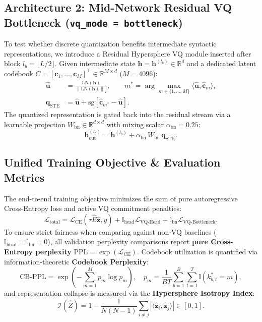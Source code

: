 \documentclass[11pt,a4paper]{article}
\newcommand{\norm}[1]{\left\lVert#1\right\rVert}
\newcommand{\R}{\mathbb{R}}
\begin{document}
\subsection{Architecture 2: Mid-Network Residual VQ Bottleneck (\texttt{vq\_mode = bottleneck})}
To test whether discrete quantization benefits intermediate syntactic representations, we introduce a Residual Hypersphere VQ module inserted after block $l_b = \lfloor L/2 \rfloor$. Given intermediate state $\bm{h} = \bm{h}^{(l_b)} \in \R^d$ and a dedicated latent codebook $C = [\bm{c}_1, \dots, \bm{c}_M]^\top \in \R^{M \times d}$ ($M = 4096$):
\begin{align}
    \hat{\bm{u}} &= \frac{\text{LN}(\bm{h})}{\norm{\text{LN}(\bm{h})}_2}, \qquad m^* = \arg\max_{m \in \{1,\dots,M\}} \langle \hat{\bm{u}}, \hat{\bm{c}}_m \rangle, \\
    \bm{q}_{\text{STE}} &= \hat{\bm{u}} + \text{sg}\!\left[\hat{\bm{c}}_{m^*} - \hat{\bm{u}}\right].
\end{align}
The quantized representation is gated back into the residual stream via a learnable projection $W_{\text{bn}} \in \R^{d \times d}$ with mixing scalar $\alpha_{\text{bn}} = 0.25$:
\begin{equation}
    \bm{h}^{(l_b)}_{\text{out}} = \bm{h}^{(l_b)} + \alpha_{\text{bn}} \, W_{\text{bn}} \, \bm{q}_{\text{STE}}.
\end{equation}

\subsection{Unified Training Objective & Evaluation Metrics}
The end-to-end training objective minimizes the sum of pure autoregressive Cross-Entropy loss and active VQ commitment penalties:
\begin{equation}
    \mathcal{L}_{\text{total}} = \mathcal{L}_{\text{CE}}\!\left(\tau \hat{E}\hat{\bm{z}}, y\right) + \mathbb{I}_{\text{head}}\mathcal{L}_{\text{VQ-Head}} + \mathbb{I}_{\text{bn}}\mathcal{L}_{\text{VQ-Bottleneck}}.
\end{equation}
To ensure strict fairness when comparing against non-VQ baselines ($\mathbb{I}_{\text{head}} = \mathbb{I}_{\text{bn}} = 0$), all validation perplexity comparisons report \textbf{pure Cross-Entropy perplexity} $\text{PPL} = \exp(\mathcal{L}_{\text{CE}})$. Codebook utilization is quantified via information-theoretic \textbf{Codebook Perplexity}:
\begin{equation}
    \text{CB-PPL} = \exp\!\left(-\sum_{m=1}^{M} p_m \log p_m\right), \quad p_m = \frac{1}{BT}\sum_{b=1}^{B}\sum_{t=1}^{T} \mathbb{I}(k^*_{b,t} = m),
\end{equation}
and representation collapse is measured via the \textbf{Hypersphere Isotropy Index}:
\begin{equation}
    \mathcal{I}(\hat{Z}) = 1 - \frac{1}{N(N-1)}\sum_{i \neq j} \left|\langle \hat{\bm{z}}_i, \hat{\bm{z}}_j \rangle\right| \in [0, 1].
\end{equation}
\end{document}
